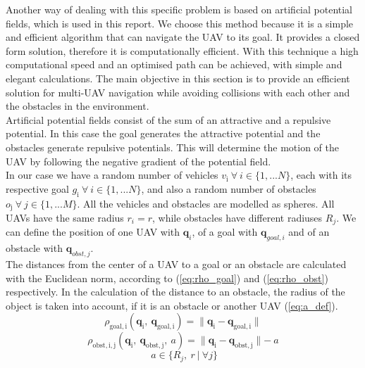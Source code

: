 \documentclass[journal, twoside]{IEEEtran}
\newcommand*{\subb}[1]{_{\mathrm{#1}}}
\begin{document}
		Another way of dealing with this specific problem is based on artificial potential fields, which is used in this report. We choose this method because it is a simple and efficient algorithm that can navigate the UAV to its goal. It provides a closed form solution, therefore it is computationally efficient. With this technique a high computational speed and an optimised path can be achieved, with simple and elegant calculations\cite{Ge2002}. The main objective in this section is to provide an efficient solution for multi-UAV navigation while avoiding collisions with each other and the obstacles in the environment.\\
		
		Artificial potential fields consist of the sum of an attractive and a repulsive potential. In this case the goal generates the attractive potential and the obstacles generate repulsive potentials. This will determine the motion of the UAV by following the negative gradient of the potential field. \\
		
		In our case we have a random number of vehicles $v\subb{i} \ \forall \ i \in \{1, ...N\}$, each with its respective goal $g\subb{i} \ \forall \ i \in \{1, ...N\}$, and also a random number of obstacles $o\subb{j} \ \forall \ j \in \{1, ...M\}$. All the vehicles and obstacles are modelled as spheres. All UAVs have the same radius $r_i = r$, while obstacles have different radiuses $R_j$. We can define the position of one UAV with $\bm{q}_i $, of a goal with $\bm{q}_{goal,i}$ and of an obstacle with $\bm{q}_{obst,j} $.\\
		
		The distances from the center of a UAV to a goal or an obstacle are calculated with the Euclidean norm, according to (\ref{eq:rho_goal}) and (\ref{eq:rho_obst}) respectively. In the calculation of the distance to an obstacle, the radius of the object is taken into account, if it is an obstacle or another UAV (\ref{eq:a_def}).
		\begin{equation} \label{eq:rho_goal}
		\rho\subb{goal, i}(\bm{q}\subb{i}, \ \bm{q}\subb{goal, i}) = \parallel \bm{q}\subb{i} - \bm{q}\subb{goal,i}\parallel
		\end{equation}
		\begin{equation} \label{eq:rho_obst}
		\rho\subb{obst, i, j}(\bm{q}\subb{i}, \ \bm{q}\subb{obst, j}, \ a) = \parallel \bm{q}\subb{i} - \bm{q}\subb{obst, j}\parallel - \ a
		\end{equation}
		\begin{equation} \label{eq:a_def}
		\ a \in \{R_j, \ r\ |\ \forall j\}
		\end{equation}
		
\end{document}
